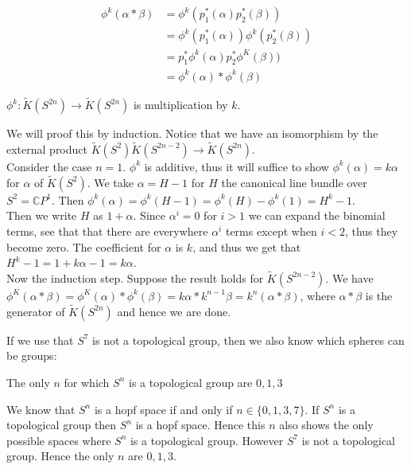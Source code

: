 \documentclass[../Thesis.tex]{subfiles}
\begin{document}
\begin{align}
\phi^k(\alpha * \beta) &= \phi^k( p_1^*(\alpha)p_2^*(\beta))\\
                       &= \phi^k( p_1^*(\alpha)) \phi^k(p_2^*(\beta))\\
                       &= p_1^* \phi^k(\alpha) p_2^*\phi^K(\beta))\\
                       &= \phi^k(\alpha) * \phi^k(\beta)
\end{align}
\begin{prop}
$\phi^k : \tilde{K}(S^{2n}) \rightarrow \tilde{K}(S^{2n})$ is multiplication by $k$.
\end{prop}
\begin{myproof}
We will proof this by induction. Notice that we have an isomorphism by the external product $\tilde{K}(S^2) \tilde{K}(S^{2n-2}) \rightarrow \tilde{K}(S^{2n})$.
\\Consider the case $n = 1$. $\phi^k$ is additive, thus it will suffice to show $\phi^k(\alpha) = k\alpha$ for $\alpha$ of $\tilde{K}(S^2)$. We take $\alpha = H-1$ for $H$ the canonical line bundle over $S^2 = \mathbb{C}P^1$. Then $\phi^k(\alpha) = \phi^k(H-1) = \phi^k(H) - \phi^k(1) = H^k - 1$.
\\Then we write $H$ as $1 + \alpha$. Since $\alpha^i = 0$ for $i > 1$ we can expand the binomial terms, see that that there are everywhere $\alpha^i$ terms except when $ i < 2$, thus they become zero. The coefficient for $\alpha$ is $k$, and thus we get that $H^k -1  = 1 + k\alpha -1 = k\alpha$.
\\Now the induction step. Suppose the result holds for $\tilde{K}(S^{2n-2})$. We have $\phi^K( \alpha * \beta) = \phi^K(\alpha) * \phi^k(\beta) = k\alpha* k^{n-1}\beta = k^n(\alpha*\beta)$, where $\alpha* \beta$ is the generator of $\tilde{K}(S^{2n})$ and hence we are done.
\end{myproof}
If we use that $S^7$ is not a topological group, then we also know which spheres can be groups:
\begin{Cor}
The only $n$ for which $S^n$ is a topological group are $0,1,3$
\end{Cor}
\begin{myproof}
We know that $S^n$ is a hopf space if and only if $n \in \{ 0,1,3, 7\}$. If $S^n$ is a topological group then $S^n$ is a hopf space. Hence this $n$ also shows the only possible spaces where $S^n$ is a topological group. However $S^7$ is not a topological group. Hence the only $n$ are $0,1,3$.
\end{myproof}
\end{document}
